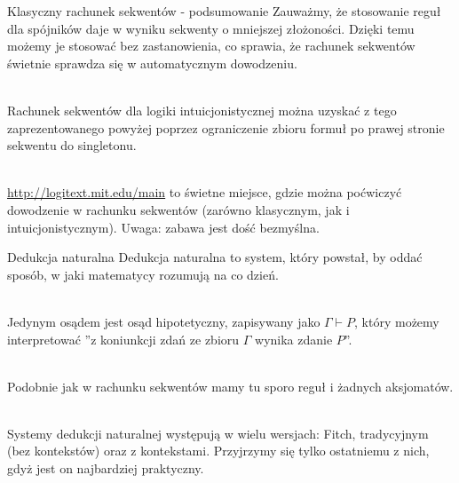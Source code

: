 \documentclass{beamer}
\begin{document}
\begin{frame}{Klasyczny rachunek sekwentów - podsumowanie}
	Zauważmy, że stosowanie reguł dla spójników daje w wyniku sekwenty o mniejszej złożoności. Dzięki temu możemy je stosować bez zastanowienia, co sprawia, że rachunek sekwentów świetnie sprawdza się w automatycznym dowodzeniu. \\~\
	
	Rachunek sekwentów dla logiki intuicjonistycznej można uzyskać z tego zaprezentowanego powyżej poprzez ograniczenie zbioru formuł po prawej stronie sekwentu do singletonu. \\~\
	
	\url{http://logitext.mit.edu/main}
	 to świetne miejsce, gdzie można poćwiczyć dowodzenie w rachunku sekwentów (zarówno klasycznym, jak i intuicjonistycznym). Uwaga: zabawa jest dość bezmyślna.
\end{frame}

\begin{frame}{Dedukcja naturalna}
	Dedukcja naturalna to system, który powstał, by oddać sposób, w jaki matematycy rozumują na co dzień. \\~\
	
	Jedynym osądem jest osąd hipotetyczny, zapisywany jako $\Gamma \vdash P$, który możemy interpretować ''z koniunkcji zdań ze zbioru $\Gamma$ wynika zdanie $P$''. \\~\
	
	Podobnie jak w rachunku sekwentów mamy tu sporo reguł i żadnych aksjomatów. \\~\
	
	Systemy dedukcji naturalnej występują w wielu wersjach: Fitch, tradycyjnym (bez kontekstów) oraz z kontekstami. Przyjrzymy się tylko ostatniemu z nich, gdyż jest on najbardziej praktyczny.
\end{frame}
\end{document}
